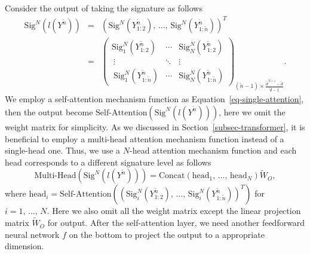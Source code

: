 \documentclass[]{article}
\renewcommand{\(}{\left(}
\renewcommand{\)}{\right)}
\begin{document}
	Consider the output of taking the signature as follows
	\begin{eqnarray}
		\label{eq-signature-output}
		\text{Sig}^N(l(Y^{\widetilde{n}}))
		&=&{(\text{Sig}^N(Y^{\widetilde{n}}_{1:2}),\,\ldots,\,\text{Sig}^N(Y^{\widetilde{n}}_{1:\widetilde{n}}))}^T \nonumber\\
		&=&
		{\begin{pmatrix}
			\text{Sig}_1^N(Y^{\widetilde{n}}_{1:2})&\cdots&\text{Sig}_N^N(Y^{\widetilde{n}}_{1:2}) \\\
			\vdots&\ddots&\vdots \\\
			\text{Sig}_1^N(Y^{\widetilde{n}}_{1:\widetilde{n}})&\cdots&\text{Sig}_N^N(Y^{\widetilde{n}}_{1:\widetilde{n}}) 
		\end{pmatrix}}_{(\widetilde{n}-1)\times\frac{\widetilde{d}^{N+1}-\widetilde{d}}{\widetilde{d}-1}}.
	\end{eqnarray}
	 We employ a self-attention mechanism function as Equation~\eqref{eq-single-attention}, then the output become $\text{Self-Attention}(\text{Sig}^N(l(Y^{\widetilde{n}})))$, here we omit the weight matrix for simplicity. As we discussed in Section~\ref{subsec-transformer}, it is beneficial to employ a multi-head attention mechanism function instead of a single-head one. Thus, we use a $N$-head attention mechanism function and each head corresponds to a different signature level as follows
	\begin{equation}
		\text{Multi-Head}(\text{Sig}^N(l(Y^{\widetilde{n}})))=\text{Concat}(\text{head}_1,\,\ldots,\,\text{head}_N)\widetilde{W}_O,
	\end{equation}
	where $\text{head}_i=\text{Self-Attention}({(\text{Sig}_i^N(Y_{1:2}^{\widetilde{n}}),\,\ldots,\,\text{Sig}_i^N(Y_{1:\widetilde{n}}^{\widetilde{n}}))}^T)$ for $i=1,\,\ldots,\,N$. Here we also omit all the weight matrix except the linear projection matrix $\widetilde{W}_O$ for output. After the self-attention layer, we need another feedforward neural network $f$ on the bottom to project the output to a appropriate dimension.
	
\end{document}

